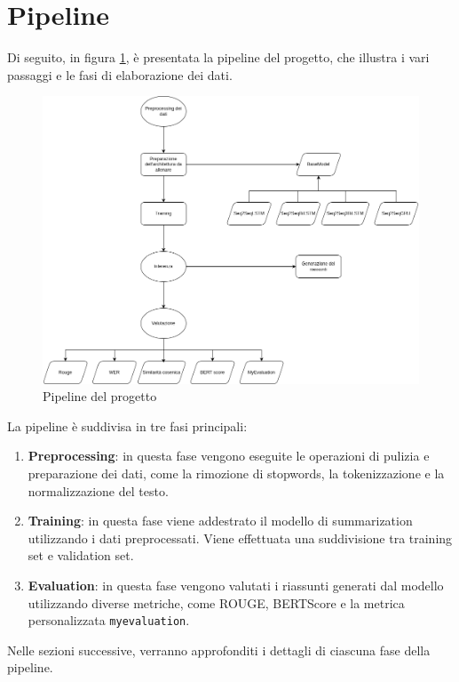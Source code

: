 \section{Pipeline}
Di seguito, in figura \ref{fig:pipeline}, è presentata la pipeline del progetto, che illustra i vari passaggi e le fasi di elaborazione dei dati.

\begin{figure}[H]
    \centering
    \includegraphics[width=1\textwidth]{media/pipeline.png}
    \caption{Pipeline del progetto}
    \label{fig:pipeline}
\end{figure}

La pipeline è suddivisa in tre fasi principali:
\begin{enumerate}
    \item \textbf{Preprocessing}: in questa fase vengono eseguite le operazioni di pulizia e preparazione dei dati, come la rimozione di stopwords, la tokenizzazione e la normalizzazione del testo.
    \item \textbf{Training}: in questa fase viene addestrato il modello di summarization utilizzando i dati preprocessati. Viene effettuata una suddivisione tra training set e validation set.
    \item \textbf{Evaluation}: in questa fase vengono valutati i riassunti generati dal modello utilizzando diverse metriche, come ROUGE, BERTScore e la metrica personalizzata \texttt{myevaluation}.
\end{enumerate}
Nelle sezioni successive, verranno approfonditi i dettagli di ciascuna fase della pipeline.